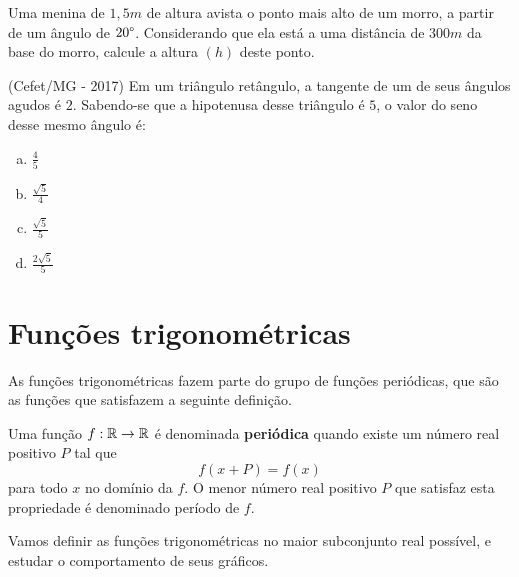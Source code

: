  \begin{exer}
 Uma menina de $1,5m$ de altura avista o ponto mais alto de um morro, a partir de um ângulo de $20\degree$. Considerando que ela está a uma distância de $300m$ da base do morro, calcule a altura $(h)$ deste ponto.
 \end{exer}
 
 \begin{exer}
 (Cefet/MG - 2017) Em um triângulo retângulo, a tangente de um de seus ângulos agudos é $2$. Sabendo-se que a hipotenusa desse triângulo é $5$, o valor do seno desse mesmo ângulo é:
 \begin{enumerate}[a)]
 \item $\frac{4}{5}$
 \item $\frac{\sqrt{5}}{4}$
 \item $\frac{\sqrt{5}}{5}$
 \item $\frac{2\sqrt{5}}{5}$
 \end{enumerate}
 \end{exer}



  \chapter{Funções trigonométricas}

  As funções trigonométricas fazem parte do grupo de funções periódicas, que são as funções que satisfazem a seguinte definição.

  \begin{defi}
   Uma função $f: \mathbb{R} \rightarrow \mathbb{R}$ é denominada \textbf{periódica} quando existe um número real positivo $P$ tal que
\begin{equation}
f(x + P)= f(x)
\end{equation}
   para todo $x$ no domínio da $f$. O menor número real positivo $P$ que satisfaz esta propriedade é denominado período de $f$.
  \end{defi}

  Vamos definir as funções trigonométricas no maior subconjunto real possível, e estudar o comportamento de seus gráficos.


